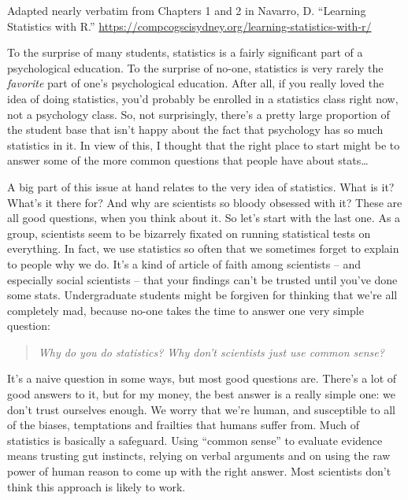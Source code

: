 \documentclass[
]{book}
\begin{document}
\begin{marginnote}

Adapted nearly verbatim from Chapters 1 and 2 in Navarro, D. ``Learning Statistics with R.'' \url{https://compcogscisydney.org/learning-statistics-with-r/}

\end{marginnote}

To the surprise of many students, statistics is a fairly significant part of a psychological education. To the surprise of no-one, statistics is very rarely the \emph{favorite} part of one's psychological education. After all, if you really loved the idea of doing statistics, you'd probably be enrolled in a statistics class right now, not a psychology class. So, not surprisingly, there's a pretty large proportion of the student base that isn't happy about the fact that psychology has so much statistics in it. In view of this, I thought that the right place to start might be to answer some of the more common questions that people have about stats\ldots{}

A big part of this issue at hand relates to the very idea of statistics. What is it? What's it there for? And why are scientists so bloody obsessed with it? These are all good questions, when you think about it. So let's start with the last one. As a group, scientists seem to be bizarrely fixated on running statistical tests on everything. In fact, we use statistics so often that we sometimes forget to explain to people why we do. It's a kind of article of faith among scientists -- and especially social scientists -- that your findings can't be trusted until you've done some stats. Undergraduate students might be forgiven for thinking that we're all completely mad, because no-one takes the time to answer one very simple question:

\begin{quote}
\emph{Why do you do statistics? Why don't scientists just use common sense?}
\end{quote}

It's a naive question in some ways, but most good questions are. There's a lot of good answers to it, but for my money, the best answer is a really simple one: we don't trust ourselves enough. We worry that we're human, and susceptible to all of the biases, temptations and frailties that humans suffer from. Much of statistics is basically a safeguard. Using ``common sense'' to evaluate evidence means trusting gut instincts, relying on verbal arguments and on using the raw power of human reason to come up with the right answer. Most scientists don't think this approach is likely to work.
\end{document}
